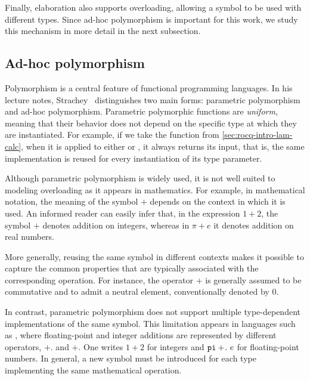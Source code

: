 
Finally, elaboration also supports overloading, allowing a symbol to be
used with different types. Since ad-hoc polymorphism is important for
this work, we study this mechanism in more detail in the next
subsection.

\subsection{Ad-hoc polymorphism}
\label{sec:ad-hoc-poly}

Polymorphism is a central feature of functional programming languages. In his
lecture notes, Strachey~\cite{polymorphism} distinguishes two main forms:
parametric polymorphism and ad-hoc polymorphism. Parametric polymorphic
functions are \emph{uniform}, meaning that their behavior does not depend on the
specific type at which they are instantiated. For example, if we take the
function  from \cref{sec:rocq-intro-lam-calc}, when it is
applied to either  or , it always returns its input, that
is, the same implementation is reused for every instantiation of its type
parameter.

Although parametric polymorphism is widely used, it is not well suited to
modeling overloading as it appears in mathematics. For example, in mathematical
notation, the meaning of the symbol $+$ depends on the context in which it is
used. An informed reader can easily infer that, in the expression $1 + 2$, the
symbol $+$ denotes addition on integers, whereas in $\pi + e$ it denotes
addition on real numbers.

More generally, reusing the same symbol in different contexts makes it possible
to capture the common properties that are typically associated with the
corresponding operation. For instance, the operator $+$ is generally assumed to
be commutative and to admit a neutral element, conventionally denoted by $0$.

In contrast, parametric polymorphism does not support multiple
type-dependent implementations of the same symbol. This limitation appears in
languages such as \ocaml, where floating-point and integer additions are
represented by different operators, $+.$ and $+$. One writes $1 + 2$ for integers
and $\pig +\!.\ e$ for floating-point numbers. In general, a new symbol must be
introduced for each type implementing the same mathematical operation.

